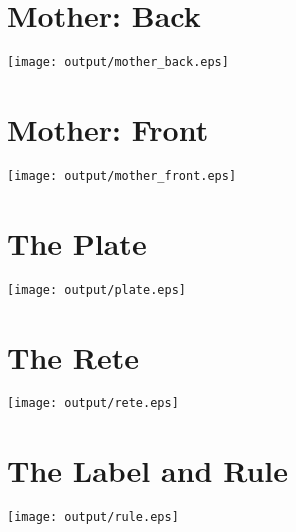 \documentclass[a4paper,onecolumn,10pt]{article}
\begin{document}
\newpage
\section*{Mother: Back}
\label{mother_back}
\vspace{-1cm}\centerline{\texttt{[image: output/mother\_back.eps]}}
\section*{Mother: Front}
\label{mother_front}
\vspace{-1cm}\centerline{\texttt{[image: output/mother\_front.eps]}}
\section*{The Plate}
\label{plate}
\vspace{1.5cm}\centerline{\texttt{[image: output/plate.eps]}}
\section*{The Rete}
\label{rete}
\vspace{1.5cm}\centerline{\texttt{[image: output/rete.eps]}}
\section*{The Label and Rule}
\label{rule}
\centerline{\texttt{[image: output/rule.eps]}}
\end{document}
